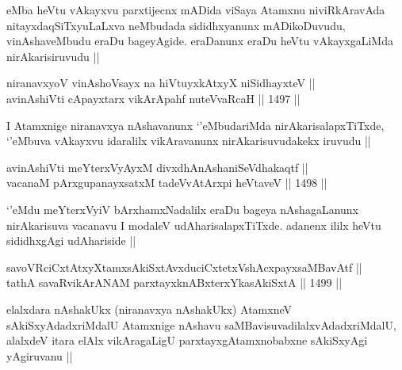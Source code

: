 \begin{artha}
eMba heVtu vAkayxvu parxtijecnx mADida viSaya Atamxnu niviRkAravAda nitayxdaqSiTxyuLaLxva neMbudada sididhxyanunx mADikoDuvudu, vinAshaveMbudu eraDu bageyAgide. eraDanunx eraDu heVtu vAkayxgaLiMda nirAkarisiruvudu ||
\end{artha}


\begin{shl}
niranavxyoV vinAshoV\s sayx na hiVtuyxkAtxyX niSidhayxteV || \\
avinAshiVti cApayxtarx vikArApahf nuteVvaRcaH ||  1497 ||  
\end{shl}

\begin{artha}
I Atamxnige niranavxya nAshavanunx `\stext'eMbudariMda nirAkarisalapxTiTxde, `\stext'eMbuva vAkayxvu idaralilx vikAravanunx nirAkarisuvudakekx iruvudu ||
\end{artha}


\begin{shl}
avinAshiVti meYterxVyAyxM divxdhAnAshaniSeVdhakaqtf || \\
vacanaM pArxgupanayxsatxM tadeVvAtArxpi heVtaveV ||  1498 ||  
\end{shl}

\begin{artha}
`\stext'eMdu meYterxVyiV bArxhamxNadalilx eraDu bageya nAshagaLanunx nirAkarisuva vacanavu I modaleV udAharisalapxTiTxde. adanenx ililx heVtu sididhxgAgi udAhariside ||
\end{artha}


\begin{shl}
savoVRciCxtAtxyXtamxsAkiSxtAvxduciCxtetxVshAcxpayxsaMBavAtf ||  \\
tathA savaRvikArANAM parxtayxknABxterxYkasAkiSxtA ||  1499 ||  
\end{shl}

\begin{artha}
elalxdara nAshakUkx (niranavxya nAshakUkx) AtamxneV sAkiSxyAdadxriMdalU Atamxnige nAshavu saMBavisuvadilalxvAdadxriMdalU, alalxdeV itara elAlx vikAragaLigU parxtayxgAtamxnobabxne sAkiSxyAgi yAgiruvanu ||
\end{artha}

